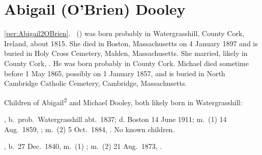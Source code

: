 \section{Abigail (O'Brien) Dooley}

\ref{per:Abigail2OBrien}.\  () was born probably in Watergrasshill, County Cork, Ireland, about 1815.\cite{Census1855Abigail} She died in Boston, Massachusetts on 4 January 1897\cite{Abigail2OBrienDeath} and is buried in Holy Cross Cemetery, Malden, Massachusetts.\cite{CarolGordon} She married, likely in County Cork, .\cite{Abigail2OBrienDeath} He was born probably in County Cork.\cite{MichaelDooleyBirth} Michael died sometime before 1 May 1865,\cite{Census1865Abigail} possibly on 1 January 1857,\cite{MichaelDooleyDeath} and is buried in North Cambridge Catholic Cemetery, Cambridge, Massachusetts.\cite{DianaBerberenaLetter2}

\begin{KidsIntro}
	Children of Abigail\textsuperscript{2} and Michael Dooley, both likely born in Watergrasshill:
\end{KidsIntro}

\begin{Kids}
	, b.\ prob.\ Watergrasshill abt.\ 1837;\cite{Census1855Hannah3Dooley} d. Boston 14 June 1911;\cite{Hannah3DooleyDeath} m.\ (1) 14 Aug.\ 1859, ;\cite{JeremiahCooneyMarriage} m.\ (2) 5 Oct.\ 1884, .\cite{MichaelCusickMarriage} No known children.
	
	, b.\ 27 Dec.\ 1840, m.\ (1) ; m.\ (2) 21 Aug.\ 1873, .
\end{Kids}
